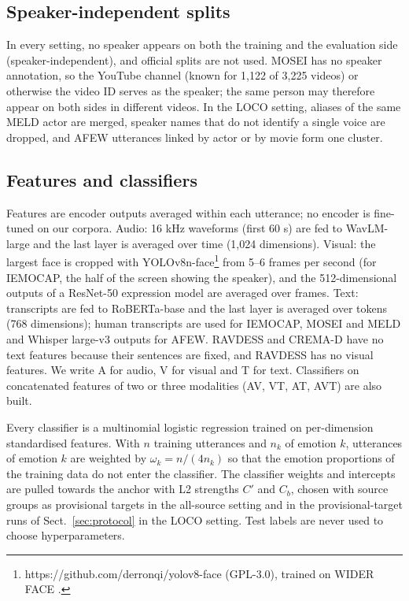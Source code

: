 \subsection{Speaker-independent splits}\label{sec:split}
In every setting, no speaker appears on both the training and the evaluation side (speaker-independent), and official splits are not used. MOSEI has no speaker annotation, so the YouTube channel (known for 1,122 of 3,225 videos) or otherwise the video ID serves as the speaker; the same person may therefore appear on both sides in different videos. In the LOCO setting, aliases of the same MELD actor are merged, speaker names that do not identify a single voice are dropped, and AFEW utterances linked by actor or by movie form one cluster.

\subsection{Features and classifiers}\label{sec:features}
Features are encoder outputs averaged within each utterance; no encoder is fine-tuned on our corpora. Audio: 16 kHz waveforms (first 60 s) are fed to WavLM-large \cite{chen2022wavlm} and the last layer is averaged over time (1,024 dimensions). Visual: the largest face is cropped with YOLOv8n-face\footnote{https://github.com/derronqi/yolov8-face (GPL-3.0), trained on WIDER FACE \cite{yang2016}.} from 5--6 frames per second (for IEMOCAP, the half of the screen showing the speaker), and the 512-dimensional outputs of a ResNet-50 expression model \cite{ryumina2022} are averaged over frames. Text: transcripts are fed to RoBERTa-base \cite{liu2019roberta} and the last layer is averaged over tokens (768 dimensions); human transcripts are used for IEMOCAP, MOSEI and MELD and Whisper large-v3 \cite{radford2023whisper} outputs for AFEW. RAVDESS and CREMA-D have no text features because their sentences are fixed, and RAVDESS has no visual features. We write A for audio, V for visual and T for text. Classifiers on concatenated features of two or three modalities (AV, VT, AT, AVT) are also built.

Every classifier is a multinomial logistic regression trained on per-dimension standardised features. With $n$ training utterances and $n_k$ of emotion $k$, utterances of emotion $k$ are weighted by $\omega_k=n/(4n_k)$ so that the emotion proportions of the training data do not enter the classifier. The classifier weights and intercepts are pulled towards the anchor with L2 strengths $C'$ and $C_b$, chosen with source groups as provisional targets in the all-source setting and in the provisional-target runs of Sect.~\ref{sec:protocol} in the LOCO setting. Test labels are never used to choose hyperparameters.

